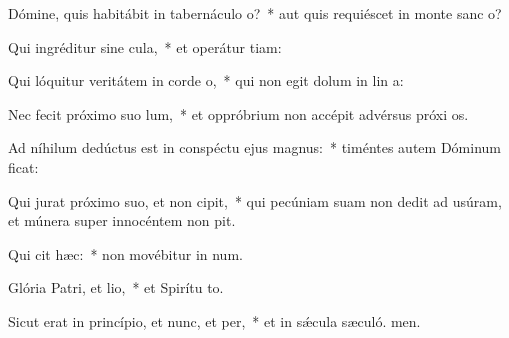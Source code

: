 \item Dómine, quis habitábit in tabernáculo o?~* aut quis requiéscet in monte sanc o?
\item Qui ingréditur sine cula,~* et operátur tiam:
\item Qui lóquitur veritátem in corde o,~* qui non egit dolum in lin a:
\item Nec fecit próximo suo lum,~* et oppróbrium non accépit advérsus próxi os.
\item Ad níhilum dedúctus est in conspéctu ejus magnus:~* timéntes autem Dóminum ficat:
\item Qui jurat próximo suo, et non cipit,~* qui pecúniam suam non dedit ad usúram, et múnera super innocéntem non pit.
\item Qui cit hæc:~* non movébitur in num.
\item Glória Patri, et lio,~* et Spirítu to.
\item Sicut erat in princípio, et nunc, et per,~* et in sǽcula sæculó. men.
